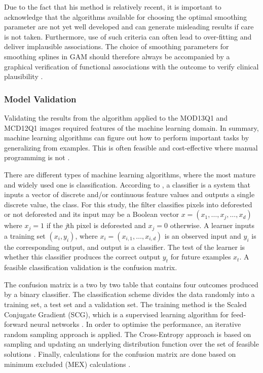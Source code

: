 Due to the fact that his method is relatively recent, it is important to acknowledge that the algorithms available for choosing the optimal smoothing parameter are  not  yet  well  developed  and  can  generate  misleading  results if care is not taken. Furthermore,  use  of  such  criteria  can  often  lead  to  over-fitting  and  deliver  implausible  associations.  The choice  of  smoothing  parameters  for  smoothing  splines  in  GAM  should  therefore  always  be  accompanied  by  a  graphical  verification  of  functional  associations  with  the outcome  to  verify  clinical  plausibility \citep{moore_2011}.

\subsubsection{Model Validation}  %

Validating the results from the algorithm applied to the MOD13Q1 and MCD12Q1 images required features of the machine learning domain. In summary, machine learning algorithms can figure out how to perform important tasks by generalizing from examples. This is often feasible and cost-effective where manual programming is not \citep{Domingos_2012}.

There are different types of machine learning algorithms, where the most mature and widely used one is classification. According to \citet{Domingos_2012}, a classifier is a system that inputs a vector of discrete and/or continuous feature values and outputs a single discrete value, the class. For this study, the filter classifies pixels into deforested or not deforested and its input may be a Boolean vector $x = (x_{1},\dots, x_{j},\dots, x_{d})$ where $x_{j} = 1$ if the \textit{j}th pixel is deforested and $x_{j} = 0$ otherwise. A learner inputs a training set $(x_{i}, y_{i})$, where $x_{i} = (x_{i,1},\dots, x_{i,d})$ is an observed input and $y_{i}$ is the corresponding output, and output is a classifier. The test of the learner is whether this classifier produces the correct output $y_{t}$ for future examples $x_{t}$. A feasible classification validation is the confusion matrix. 


The confusion matrix is a two by two table that contains four outcomes produced by a binary classifier. The classification scheme divides the data randomly into a training set, a test set and a validation set. The training method is the Scaled Conjugate Gradient (SCG), which is a supervised learning algorithm for feed-forward neural networks \citep{mor_1993}. In order to optimise the performance, an iterative random sampling approach is applied. The Cross-Entropy approach is based on sampling and updating an underlying distribution function over the set of feasible solutions \citep{HU_2009}. Finally, calculations for the confusion matrix are done based on minimum excluded (MEX) calculations \citep{matlab_2017}.

